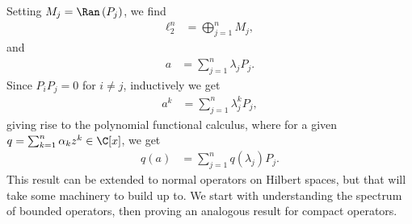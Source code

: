 \documentclass[10pt]{mypackage}
\begin{document}
Setting $M_j = \Ran\left(P_j\right)$, we find
\begin{align*}
  \ell_2^{n} &= \bigoplus_{j=1}^{n}M_j,
\end{align*}
and
\begin{align*}
  a &= \sum_{j=1}^{n}\lambda_jP_j.
\end{align*}
Since $P_iP_j = 0$ for $i\neq j$, inductively we get
\begin{align*}
  a^k &= \sum_{j=1}^{n}\lambda_j^{k}P_j,
\end{align*}
giving rise to the polynomial functional calculus, where for a given $q = \sum_{k=1}^{n}\alpha_kz^k\in \C[x]$, we get
\begin{align*}
  q\left(a\right) &= \sum_{j=1}^{n}q\left(\lambda_j\right)P_j.
\end{align*}
This result can be extended to normal operators on Hilbert spaces, but that will take some machinery to build up to. We start with understanding the spectrum of bounded operators, then proving an analogous result for compact operators.
\end{document}

